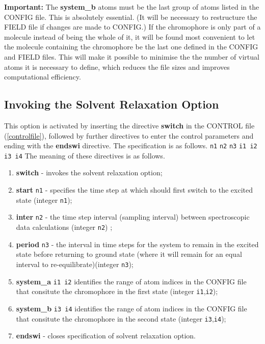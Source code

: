 {\bf Important:} The {\bf system\_b} atoms must be the last group of atoms
listed in the CONFIG file. This is absolutely essential. (It will be necessary
to restructure the FIELD file if changes are made to CONFIG.)  If the
chromophore is only part of a molecule instead of being the whole of it, it
will be found most convenient to let the molecule containing the chromophore
be the last one defined in the CONFIG and FIELD files. This will make it
possible to minimise the the number of virtual atoms it is necessary to
define, which reduces the file sizes and improves computational efficiency.

\subsection{Invoking the Solvent Relaxation Option}
\label{SISS}
This option is activated by inserting the directive {\bf switch}
in the CONTROL file (\ref{controlfile}), followed by further directives to
enter the control parameters and ending with the {\bf endswi} directive. The
specification is as follows.\newline \newline
{} \newline
{} {\tt n1} \newline
{} {\tt n2} \newline
{} {\tt n3} \newline
{} {\tt i1 i2} \newline
{} {\tt i3 i4} \newline
{}\newline       
\newline
The meaning of these directives is as follows.
\begin{enumerate}
\item {\bf switch} - invokes the solvent relaxation option;
\item {\bf start} {\tt n1} - specifies the  time step at
  which \D{} should first switch to the excited state (integer {\tt n1});
\item {\bf inter} {\tt n2} - the time step interval (sampling interval)
  between spectroscopic data calculations (integer {\tt n2}) ;
\item {\bf period} {\tt n3} - the interval in time steps for the system to
  remain in the excited state before returning to ground state (where it will
  remain for an equal interval to re-equilibrate)(integer {\tt n3});
\item {\bf system\_a} {\tt i1 i2} identifies the range of atom indices in 
the CONFIG file that consitute the chromophore in the first state (integer 
{\tt i1},{\tt i2});
\item {\bf system\_b} {\tt i3 i4} identifies the range of atom indices in 
the CONFIG file that consitute the chromophore in the second state (integer 
{\tt i3},{\tt i4});
\item {\bf endswi} - closes specification of solvent relaxation option.
\end{enumerate}


